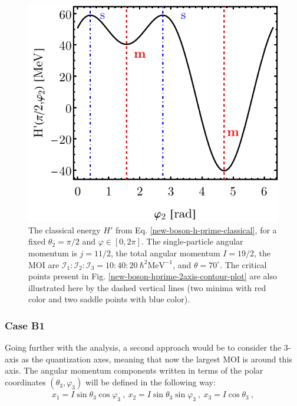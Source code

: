 \begin{figure}
    \begin{center}
        \includegraphics[scale=0.8]{Chapters/Figures/New-Boson-Classical-H-2-axis-varphi-plot.pdf}
        \caption{The classical energy $H'$ from Eq. \ref{new-boson-h-prime-classical}, for a fixed $\theta_2=\pi/2$ and $\varphi\in[0,2\pi]$. The single-particle angular momentum is $j=11/2$, the total angular momentum $I=19/2$, the MOI are $\mathcal{I}_1:\mathcal{I}_2:\mathcal{I}_3=10:40:20\ \hbar^2\text{MeV}^{-1}$, and $\theta=70^\circ$. The critical points present in Fig. \ref{new-boson-hprime-2axis-contour-plot} are also illustrated here by the dashed vertical lines (two minima with red color and two saddle points with blue color).}
        \label{new-boson-hprime-2axis-varphi-plot}
    \end{center}
\end{figure}

\subsubsection*{Case B1}

Going further with the analysis, a second approach would be to consider the $3$-axis as the quantization axes, meaning that now the largest MOI is around this axis. The angular momentum components written in terms of the polar coordinates $(\theta_3,\varphi_3)$ will be defined in the following way:
\begin{align}
    x_1=I\sin\theta_3\cos\varphi_3\ ,\ x_2=I\sin\theta_3\sin\varphi_3\ ,\ x_3=I\cos\theta_3\ ,
    \label{polar-coordinates-case-b1}
\end{align}

